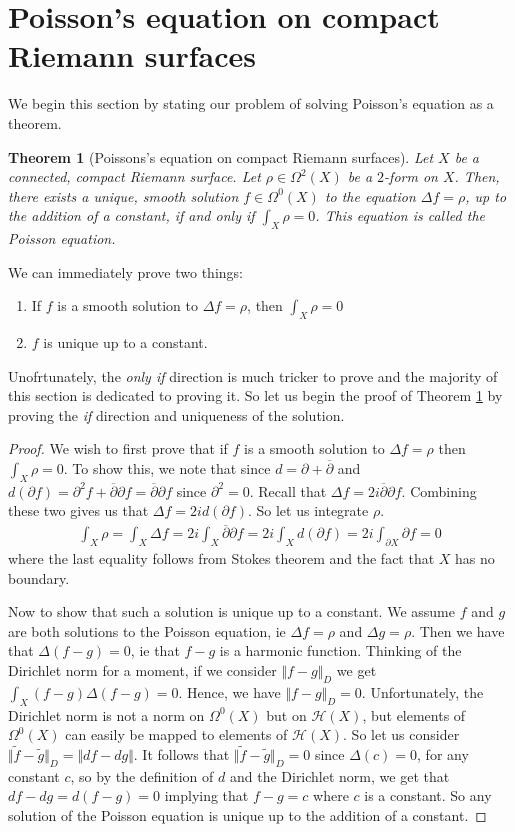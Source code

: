 \documentclass[11pt]{report}
\newtheorem{thm}{Theorem}[section]
\theoremstyle{definition}
\begin{document}
\section{Poisson's equation on compact Riemann surfaces}
We begin this section by stating our problem of solving Poisson's equation as a theorem.
\begin{thm}[Poissons's equation on compact Riemann surfaces]\label{compactPoisson}
  Let $X$ be a connected, compact Riemann surface. Let $\rho \in \Omega^2(X)$ be a $2$-form on $X$. Then, there exists a unique, smooth solution $f \in \Omega^0(X)$ to the equation $\Delta f = \rho$, up to the addition of a constant, if and only if $\int_X \rho = 0$. This equation is called the Poisson equation.
\end{thm}
We can immediately prove two things:
\begin{enumerate}
  \item If $f$ is a smooth solution to $\Delta f = \rho$, then $\int_X \rho= 0$
  \item $f$ is unique up to a constant.
\end{enumerate}
Unofrtunately, the \emph{only if} direction is much tricker to prove and the majority of this section is dedicated to proving it. So let us begin the proof of Theorem \ref{compactPoisson} by proving the \emph{if} direction and uniqueness of the solution.
\begin{proof}
  We wish to first prove that if $f$ is a smooth solution to $\Delta f = \rho$ then $\int_X \rho = 0$. To show this, we note that since $d = \partial + \overline{\partial}$ and $d(\partial f) = \partial^2 f + \overline{\partial}\partial f = \overline{\partial}\partial f$ since $\partial^2 = 0$. Recall that  $\Delta f = 2i \overline{\partial}\partial f$. Combining these two gives us that $\Delta f =2id(\partial f)$. So let us integrate $\rho$.
  \begin{align*}
    \int_X \rho = \int_X \Delta f = 2i \int_X \overline{\partial}\partial f = 2i \int_X d(\partial f) = 2i\int_{\partial X}\partial f = 0
  \end{align*}
  where the last equality follows from Stokes theorem and the fact that $X$ has no boundary. 

  Now to show that such a solution is unique up to a constant. We assume $f$ and $g$ are both solutions to the Poisson equation, ie $\Delta f = \rho$ and $\Delta g = \rho$. Then we have that $\Delta (f - g) = 0$, ie that $f-g$ is a harmonic function. Thinking of the Dirichlet norm for a moment, if we consider $\Vert f-g\Vert _D$ we get $\int_X (f-g)\Delta(f-g) = 0$. Hence, we have $\Vert f-g\Vert _D = 0$. Unfortunately, the Dirichlet norm is not a norm on $\Omega^0(X)$ but on $\mathcal{H}(X)$, but elements of $\Omega^0(X)$ can easily be mapped to elements of $\mathcal{H}(X)$. So let us consider $\Vert \tilde{f}-\tilde{g}\Vert _D = \Vert df - dg\Vert $. It follows that $\Vert \tilde{f}- \tilde{g}\Vert _D = 0$ since $\Delta(c) = 0$, for any constant $c$, so by the definition of $d$ and the Dirichlet norm, we get that $ df - dg = d(f-g) = 0$ implying that $f - g = c$ where $c$ is a constant. So any solution of the Poisson equation is unique up to the addition of a constant.
\end{proof} 
\end{document}
